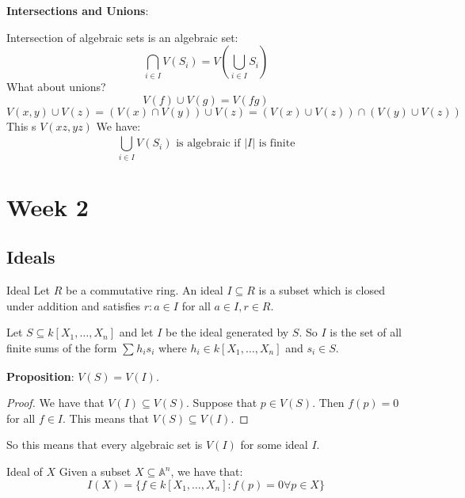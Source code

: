 \documentclass{report}
\begin{document}
\textbf{Intersections and Unions}: 

Intersection of algebraic sets is an algebraic set:
    \begin{equation*}
        \bigcap_{i \in I}^{} V(S_{i}) = V(\bigcup_{i \in I}^{} S_{i})
    \end{equation*}
What about unions?
    \begin{equation*}
        V(f) \cup  V(g) = V(fg)
    \end{equation*}
    \begin{equation*}
        V(x, y) \cup  V(z) = (V(x) \cap V(y)) \cup  V(z) = (V(x) \cup  V(z)) \cap  (V(y) \cup  V(z))
    \end{equation*}
    This s $V(xz, yz)$
We have:
    \begin{equation*}
        \bigcup_{i \in I}^{} V(S_{i}) \text{ is algebraic if $\lvert I \rvert$ is finite}
    \end{equation*}

\chapter{Week 2}

\begin{topic}
    \section{Ideals}
\end{topic}

\begin{definition}{Ideal}
    Let $R$ be a commutative ring. An ideal $I \subseteq R$ is a subset which is closed under addition and satisfies $r : a \in I$ for all $a \in I, r \in R$.
\end{definition} 

Let $S \subseteq k[X_{1}, \ldots, X_{n}]$ and let $I$ be the ideal generated by $S$. So $I$ is the set of all finite sums of the form $\sum_{}^{} h_{i}s_{i}$ where $h_{i} \in k[X_{1}, \ldots, X_{n}]$ and $s_{i} \in S$.

\textbf{Proposition}: $V(S) = V(I)$.
    \begin{proof}
        We have that $V(I) \subseteq V(S)$. Suppose that $p \in V(S)$. Then $f(p) = 0$ for all $f \in I$. This means that $V(S) \subseteq V(I)$.
    \end{proof}

So this means that every algebraic set is $V(I)$ for some ideal $I$.

\begin{definition}{Ideal of $X$}
    Given a subset $X \subseteq \mathbb{A}^{n}$, we have that:
        \begin{equation*}
            I(X) = \{f \in k[X_{1}, \ldots, X_{n}]: f(p) = 0 \forall p \in X\}
        \end{equation*}
\end{definition}
\end{document}
